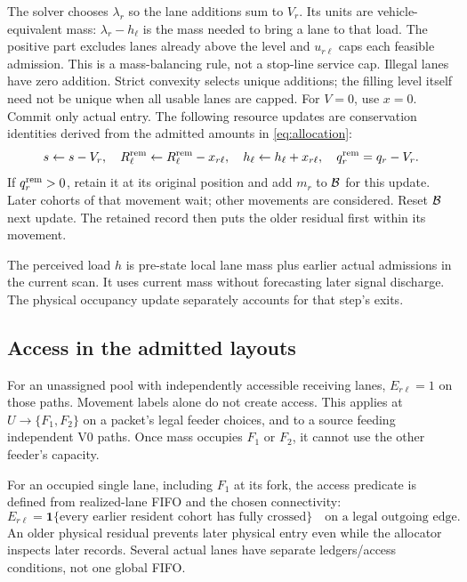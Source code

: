 \documentclass[10pt,a4paper]{article}
\begin{document}
The solver chooses $\lambda_r$ so the lane additions sum to $V_r$.
Its units are vehicle-equivalent mass: $\lambda_r-h_\ell$ is the mass
needed to bring a lane to that load. The positive part excludes lanes
already above the level and $u_{r\ell}$ caps each feasible admission.
This is a mass-balancing rule, not a stop-line service cap. Illegal lanes
have zero addition. Strict convexity selects unique additions; the filling
level itself need not be unique when all usable lanes are capped.
For $V=0$, use $x=0$. Commit only actual entry.
The following resource updates are conservation identities derived from the admitted amounts in \eqref{eq:allocation}:
\begin{equation}
 s\leftarrow s-V_r,\quad
 R^{\rm rem}_\ell\leftarrow R^{\rm rem}_\ell-x_{r\ell},\quad
 h_\ell\leftarrow h_\ell+x_{r\ell},\quad
 q_r^{\rm rem}=q_r-V_r .
 \label{eq:allocation-update}
\end{equation}
If $q_r^{\rm rem}>0$, retain it at its original position and add $m_r$
to ${\cal B}$ for this update. Later cohorts of that movement wait;
other movements are considered. Reset ${\cal B}$ next update.
The retained record then puts the older residual first within its
movement.

The perceived load $h$ is pre-state local lane mass plus earlier actual
admissions in the current scan. It uses current mass without forecasting
later signal discharge. The physical occupancy update separately accounts
for that step's exits.

\subsection*{Access in the admitted layouts}

For an unassigned pool with independently accessible receiving lanes,
$E_{r\ell}=1$ on those paths. Movement labels alone do not create access.
This applies at $U\to\{F_1,F_2\}$ on a packet's legal feeder choices,
and to a source feeding independent V0 paths. Once mass occupies $F_1$
or $F_2$, it cannot use the other feeder's capacity.

For an occupied single lane, including $F_1$ at its fork,
the access predicate is defined from realized-lane FIFO and the chosen connectivity:
\begin{equation}
 E_{r\ell}
 =\mathbf1\{\text{every earlier resident cohort has fully crossed}\}
 \quad\text{on a legal outgoing edge}.
 \label{eq:physical-access}
\end{equation}
An older physical residual prevents later physical entry even while the
allocator inspects later records. Several actual lanes have separate
ledgers/access conditions, not one global FIFO.
\end{document}

